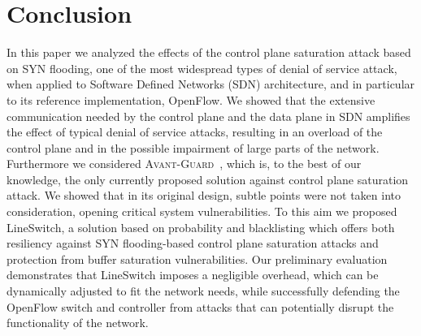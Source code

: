 \documentclass{sig-alternate}
\newcommand{\avantguard}{\textsc{Avant-Guard}}
\begin{document}
\section{Conclusion}\label{sec:conclusion}
In this paper we analyzed the effects of the control plane saturation attack based on SYN flooding, one of the most widespread types of denial of service attack, 
when applied to Software Defined Networks (SDN) architecture, and in particular to its reference implementation, OpenFlow.
We showed that the extensive communication needed by the control plane and the data plane in SDN amplifies the effect of typical denial of service attacks, resulting in an overload of the control plane and in the possible impairment of large parts of the network. 
Furthermore we considered \avantguard~\cite{AvantGuard}, which is, to the best of our knowledge, the only currently proposed solution against control plane saturation attack. We showed that in its original design, subtle points were not taken into consideration, opening critical system vulnerabilities.
To this aim we proposed LineSwitch, a solution based on probability and blacklisting which offers both resiliency against SYN flooding-based control plane saturation attacks and protection from buffer saturation vulnerabilities.
Our preliminary evaluation demonstrates that LineSwitch imposes a negligible overhead, which can be dynamically adjusted to fit the network needs, 
while successfully defending the OpenFlow switch and controller from attacks that can potentially disrupt the functionality of the network.

\balance


\end{document}
